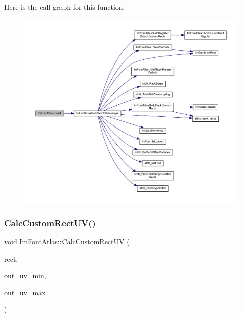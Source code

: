 Here is the call graph for this function\+:
\nopagebreak
\begin{figure}[H]
\begin{center}
\leavevmode
\includegraphics[width=350pt]{struct_im_font_atlas_a81e39e30dffa4dd7e458a53297451e27_cgraph}
\end{center}
\end{figure}
\mbox{\label{struct_im_font_atlas_a70e062104b11a213eb3d177151c418e2}} 
\subsubsection{\texorpdfstring{Calc\+Custom\+Rect\+U\+V()}{CalcCustomRectUV()}}
{\footnotesize\ttfamily void Im\+Font\+Atlas\+::\+Calc\+Custom\+Rect\+UV (\begin{DoxyParamCaption}\item[{const \mbox{\hyperlink{struct_im_font_atlas_1_1_custom_rect}{Custom\+Rect}} $\ast$}]{rect,  }\item[{\mbox{\hyperlink{struct_im_vec2}{Im\+Vec2}} $\ast$}]{out\+\_\+uv\+\_\+min,  }\item[{\mbox{\hyperlink{struct_im_vec2}{Im\+Vec2}} $\ast$}]{out\+\_\+uv\+\_\+max }\end{DoxyParamCaption})}

